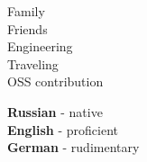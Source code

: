 \documentclass[11pt]{developercv} %
\begin{document}
\vspace{1.5cm}
\hfill
\begin{minipage}[t]{0.3\textwidth}
  \vspace{-\baselineskip} %


  Family\\
  Friends\\
  Engineering\\
  Traveling\\
  OSS contribution
\end{minipage}
\hfill
\begin{minipage}[t]{0.3\textwidth}
  \vspace{-\baselineskip} %

  
  \textbf{Russian} - native\\
  \textbf{English} - proficient\\
  \textbf{German} - rudimentary
\end{minipage}
\hfill

\end{document}
